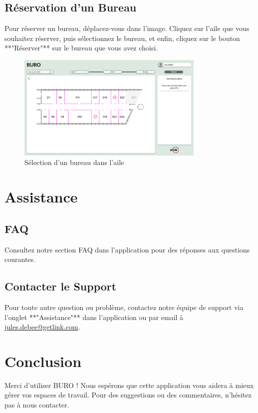 \documentclass{article}
\begin{document}
\subsection{Réservation d'un Bureau}
Pour réserver un bureau, déplacez-vous dans l'image. Cliquez sur l'aile que vous souhaitez réserver, puis sélectionnez le bureau, et enfin, cliquez sur le bouton **"Réserver"** sur le bureau que vous avez choisi.

\begin{figure}[h]
\centering
\includegraphics[width=0.8\textwidth]{./Img/BURO_AileD.png}
\caption{Sélection d'un bureau dans l'aile}
\end{figure}

\par

\section{Assistance}

\subsection{FAQ}
Consultez notre section FAQ dans l'application pour des réponses aux questions courantes.

\subsection{Contacter le Support}
Pour toute autre question ou problème, contactez notre équipe de support via l'onglet **"Assistance"** dans l'application ou par email à \href{mailto:jules.debee@getlink.com}{jules.debee@getlink.com}.

\section{Conclusion}
Merci d'utiliser BURO ! Nous espérons que cette application vous aidera à mieux gérer vos espaces de travail. Pour des suggestions ou des commentaires, n'hésitez pas à nous contacter.
\end{document}
